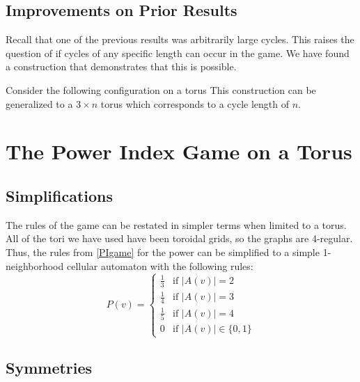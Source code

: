 \documentclass[12pt]{article}
\theoremstyle{definition}
\theoremstyle{remark}
\theoremstyle{remark}
\begin{document}
\subsection{Improvements on Prior Results} \label{Improvements}
\par
Recall that one of the previous results was arbitrarily large cycles. This raises the question of if cycles of any specific length can occur in the game. We have found a construction that demonstrates that this is possible.
\par
Consider the following configuration on a torus %
This construction can be generalized to a $3\times n$ torus which corresponds to a cycle length of $n$. 

\section{The Power Index Game on a Torus} \label{Main Chapter}
\subsection{Simplifications}
The rules of the game can be restated in simpler terms when limited to a torus. All of the tori we have used have been toroidal grids, so the graphs are 4-regular. Thus, the rules from \ref{PIgame} for the power can be simplified to a simple 1-neighborhood cellular automaton with the following rules:
\begin{equation}
	P(v) =
	\begin{cases}
		\frac{1}{3} & \text{if $|A(v)|=2$} \\
		\frac{1}{4} & \text{if $|A(v)|=3$} \\
		\frac{1}{5} & \text{if $|A(v)|=4$} \\
		0 & \text{if $|A(v)|\in \{0,1\}$}
	\end{cases}
\end{equation}
	
	
\subsection{Symmetries}
\end{document}
